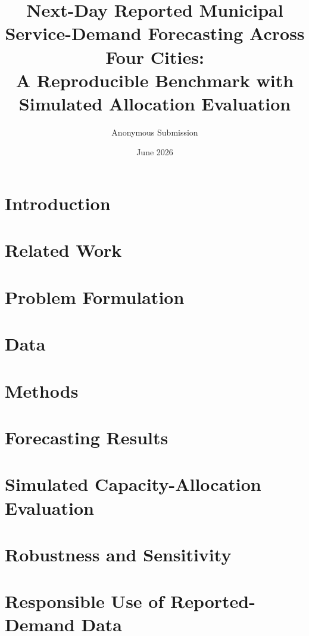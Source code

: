\documentclass[11pt]{article}
\title{Next-Day Reported Municipal Service-Demand Forecasting Across Four
Cities:\\
\large A Reproducible Benchmark with Simulated Allocation Evaluation}
\author{Anonymous Submission}
\date{June 2026}
\begin{document}
\maketitle

\begin{abstract}

\end{abstract}

\section{Introduction}


\section{Related Work}


\section{Problem Formulation}


\section{Data}


\section{Methods}


\section{Forecasting Results}


\section{Simulated Capacity-Allocation Evaluation}


\section{Robustness and Sensitivity}


\section{Responsible Use of Reported-Demand Data}

\end{document}

